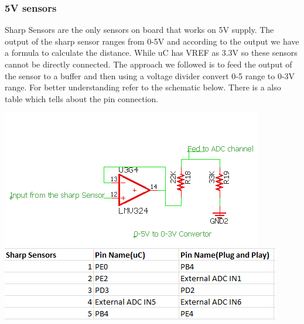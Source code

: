 \documentclass[a4paper,10pt,oneside]{article}
\begin{document}
{		\subsubsection{\Large \textbf{5V sensors}}
		{Sharp Sensors are the only sensors on board that works on 5V supply. The output of the sharp sensor ranges from 0-5V and according to the output we have a formula to calculate the distance. While uC has VREF as 3.3V so these sensors cannot be directly connected. The approach we followed is to feed the output of the sensor to a buffer and then using a voltage divider convert 0-5 range to 0-3V range. For better understanding refer to the schematic below. There is a  also table which tells about the pin connection.}
		\begin{center}
			\includegraphics{5Vsensor1}\\
			\includegraphics{5Vsensor2}\\
		\end{center}
}
\end{document}
